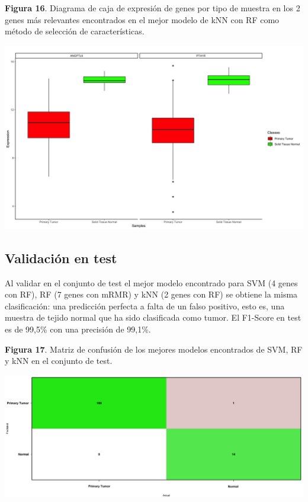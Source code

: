 \newpage
\begin{center}
\textbf{Figura 16}. Diagrama de caja de expresión de genes por tipo de muestra en los 2 genes más relevantes encontrados en el mejor modelo de kNN con RF como método de selección de características.
\end{center}
\begin{center}
	\includegraphics[width=1\textwidth]{figuras/16_higado_biclase_43_knn_boxplots_mejor_metodo.png} 
\end{center}

\newpage

\subsection{Validación en test}

Al validar en el conjunto de test el mejor modelo encontrado para SVM (4 genes con RF), RF (7 genes con mRMR) y kNN (2 genes con RF) se obtiene la misma clasificación: una predicción perfecta a falta de un falso positivo, esto es, una muestra de tejido normal que ha sido clasificada como tumor. El F1-Score en test es de 99,5\% con una precisión de 99,1\%.\\

\begin{center}
	\textbf{Figura 17}. Matriz de confusión de los mejores modelos encontrados de SVM, RF y kNN en el conjunto de test.
\end{center}

\begin{center}
	\includegraphics[width=1\textwidth]{figuras/17_higado_biclase_18_svm_matriz_confusion_mejor_metodo.png} 
\end{center}

